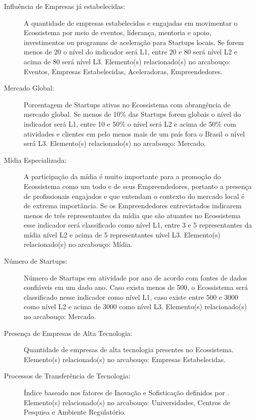 \begin{description}
  \item [Influência de Empresas já estabelecidas:] A quantidade de empresas estabelecidas e engajadas em movimentar o Ecossistema por meio de eventos, líderança, mentoria e apoio, investimentos ou programas de aceleração para Startups locais. Se forem menos de 20 o nível do indicador será L1, entre 20 e 80 será nível L2 e acima de 80 será nível L3. Elemento(s) relacionado(s) no arcabouço: Eventos, Empresas Estabelecidas, Aceleradoras, Empreendedores.
  
  \item [Mercado Global:] Porcentagem de Startups ativas no Ecossistema com abrangência de mercado global. Se menos de 10\% das Startups forem globais o nível do indicador será L1, entre 10 e 50\% o nível será L2 e acima de 50\% com atividades e clientes em pelo menos mais de um país fora o Brasil o nível será L3. Elemento(s) relacionado(s) no arcabouço: Mercado.
  
  \item [Mídia Especializada:] A participação da mídia é muito importante para a promoção do Ecossistema como um todo e de seus Empreendedores, portanto a presença de profissionais engajados e que entendam o contexto do mercado local é de extrema importância. Se os Empreendedores entrevistados indicarem menos de três representantes da mídia que são atuantes no Ecossistema esse indicador será classificado como nível L1, entre 3 e 5 representantes da mídia nível L2 e acima de 5 representantes nível L3. Elemento(s) relacionado(s) no arcabouço: Mídia.
  
  \item [Número de Startups:] Número de Startups em atividade por ano de acordo com fontes de dados confiáveis em um dado ano. Caso exista menos de 500, o Ecossistema será classificado nesse indicador como nível L1, caso existe entre 500 e 3000 como nível L2 e acima de 3000 como nível L3. Elemento(s) relacionado(s) no arcabouço: Mercado.
  
  \item [Presença de Empresas de Alta Tecnologia:] Quantidade de empresas de alta tecnologia presentes no Ecossistema. Elemento(s) relacionado(s) no arcabouço: Empresas Estabelecidas.
  
  \item [Processos de Transferência de Tecnologia:] Índice baseado nos fatores de Inovação e Sofisticação definidos por . Elemento(s) relacionado(s) no arcabouço: Universidades, Centros de Pesquisa e Ambiente Regulatório.
  

\end{description}
